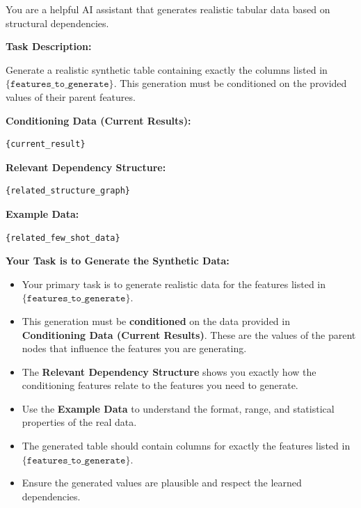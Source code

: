 \begin{tcolorbox}[
    float*=t, width=\textwidth, floatplacement=htbp,
    colback=blue!5!white,  %
    colframe=blue!75!black, %
    title={Prompt for Graph-Planned Conditional Synthesis ($\pi_\mathtt{data\_gen}$)}, %
    fonttitle=\bfseries\color{white}, %
    arc=2mm, %
    boxrule=1pt %
]
\small 

You are a helpful AI assistant that generates realistic tabular data based on structural dependencies.

\vspace{\medskipamount} %

\textbf{Task Description:}

Generate a realistic synthetic table containing exactly the columns listed in 
$\texttt{\{features\_to\_generate\}}$. This generation must be conditioned on the provided values 
of their parent features.

\vspace{\medskipamount} %

\textbf{Conditioning Data (Current Results):}
\begin{verbatim}
{current_result}
\end{verbatim}
\vspace{\medskipamount} %

\textbf{Relevant Dependency Structure:}
\begin{verbatim}
{related_structure_graph}
\end{verbatim}
\vspace{\medskipamount} %

\textbf{Example Data:}
\begin{verbatim}
{related_few_shot_data}
\end{verbatim}
\vspace{\medskipamount} %

\textbf{Your Task is to Generate the Synthetic Data:}
\begin{itemize}[leftmargin=*, itemsep=2pt]
    \item Your primary task is to generate realistic data for the features listed in $\texttt{\{features\_to\_generate\}}$.
    \item This generation must be \textbf{conditioned} on the data provided in \textbf{Conditioning Data (Current Results)}. These are the values of the parent nodes that influence the features you are generating.
    \item The \textbf{Relevant Dependency Structure} shows you exactly how the conditioning features relate to the features you need to generate.
    \item Use the \textbf{Example Data} to understand the format, range, and statistical properties of the real data.
    \item The generated table should contain columns for exactly the features listed in $\texttt{\{features\_to\_generate\}}$.
    \item Ensure the generated values are plausible and respect the learned dependencies.
\end{itemize}


\end{tcolorbox}
